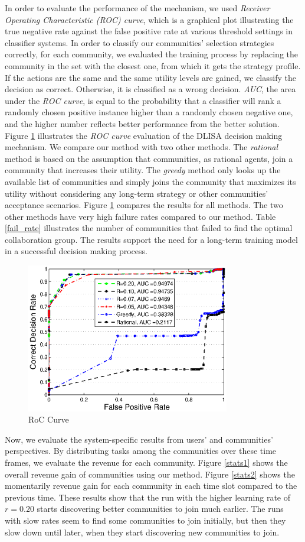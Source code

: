 \documentclass[10pt,journal,cspaper,compsoc]{IEEEtran}
\begin{document}
In order to evaluate the performance of the mechanism, we used \emph{Receiver Operating Characteristic (ROC) curve}, which is a graphical plot illustrating the true negative rate against the false positive rate at various threshold settings in classifier systems. In order to classify our communities' selection strategies correctly, for each community, we evaluated the training process by replacing the community in the set with the closest one, from which it gets the strategy profile. If the actions are the same and the same utility levels are gained, we classify the decision as correct. Otherwise, it is classified as a wrong decision. \emph{AUC}, the area under the \emph{ROC curve}, is equal to the probability that a classifier will rank a randomly chosen positive instance higher than a randomly chosen negative one, and the higher number reflects better performance from the better solution.  Figure \ref{roc5} illustrates the \emph{ROC curve} evaluation of the DLISA decision making mechanism. We compare our method with two other methods. The \emph{rational} method is based on the assumption that communities, as rational agents, join a community that increases their utility. The \emph{greedy} method only looks up the available list of communities and simply joins the community that maximizes its utility without considering any long-term strategy or  other communities' acceptance scenarios. Figure \ref{roc5} compares the results for all methods. The two other methods have very high failure rates compared to our method. Table \ref{fail_rate} illustrates the number of communities that failed to find the optimal collaboration group. The results support the need for a long-term training model in a successful decision making process.

\begin{figure}%
\centering
\includegraphics[width=3.5in]{figures/roc.eps}
\caption{RoC Curve}
\label{roc5}
\end{figure}
Now, we evaluate the system-specific results from users' and communities' perspectives. By distributing tasks among the communities over these time frames, we evaluate the revenue for each community. Figure \ref{stats1} shows the overall revenue gain of communities using our method. Figure \ref{stats2} shows the momentarily revenue gain for each community in each time slot compared to the previous time. These results show that the run with the higher learning rate of $r=0.20$ starts discovering better communities to join much earlier. The runs with slow rates seem to find some communities to join initially, but then they slow down until later, when they start discovering new communities to join.
\end{document}
